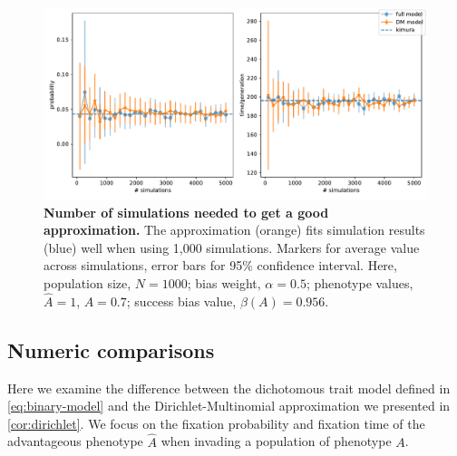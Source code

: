 \documentclass[12pt]{extarticle}
\begin{document}
\begin{figure}[h]
    \includegraphics[width=\linewidth]{../figures/binary/num_sims.pdf}
  \caption{
  \textbf{Number of simulations needed to get a good approximation.}
  The approximation (orange) fits simulation results (blue) well when using 1,000 simulations. %
  Markers for average value across simulations, error bars for 95\% confidence interval.
  Here, population size, $N=1000$; bias weight, $\alpha=0.5$; phenotype values, $\hat{A}=1$, $A=0.7$; success bias value, $\beta(A)=0.956$.}	
  \label{fig:num_sims}
\end{figure}

\subsection*{Numeric comparisons} %

Here we examine the difference between the dichotomous trait model defined in \cref{eq:binary-model} and the Dirichlet-Multinomial approximation we presented in \cref{cor:dirichlet}. We focus on the fixation probability and fixation time of the advantageous phenotype $\hat{A}$ when invading a population of phenotype $A$.
\end{document}
